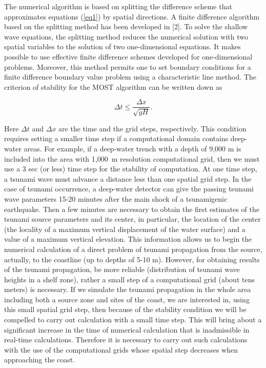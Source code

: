 \documentclass{aip-cp}
\begin{document}
The numerical algorithm is based on splitting the difference scheme that 
approximates equations (\ref{eq1}) by spatial directions. A finite difference 
algorithm based on the splitting method has been developed in [2]. To solve 
the shallow wave equations, the splitting method reduces the numerical 
solution with two spatial variables to the solution of two one-dimensional 
equations. It makes possible to use effective finite difference schemes 
developed for one-dimensional problems. Moreover, this method permits one to 
set boundary conditions for a finite difference boundary value problem using 
a characteristic line method. The criterion of stability for the MOST 
algorithm can be written down as 

\begin{equation}
\label{eq4}
\Delta t \le \frac{\Delta x} { \sqrt{gH}} .
\end{equation}

Here $\Delta t$ and $\Delta x$ are the time and the grid steps, respectively. 
This condition requires setting a smaller time step if a computational 
domain contains deep-water areas. For example, if a deep-water trench with a 
depth of 9,000 m is included into the area with 1,000~m resolution 
computational grid, then we must use a 3 sec (or less) time step for the 
stability of computation. At one time step, a tsunami wave must advance a 
distance less than one spatial grid step. In the case of tsunami occurrence, 
a deep-water detector can give the passing tsunami wave parameters 15-20 
minutes after the main shock of a tsunamigenic earthquake. Then a few 
minutes are necessary to obtain the first estimates of the tsunami source 
parameters and its center, in particular, the location of the center (the 
locality of a maximum vertical displacement of the water surface) and a 
value of a maximum vertical elevation. This information allows us to begin 
the numerical calculation of a direct problem of tsunami propagation from 
the source, actually, to the coastline (up to depths of 5-10 m). However, 
for obtaining results of the tsunami propagation, be more reliable 
(distribution of tsunami wave heights in a shelf zone), rather a small step 
of a computational grid (about tens meters) is necessary. If we simulate the 
tsunami propagation in the whole area including both a source zone and sites 
of the coast, we are interested in, using this small spatial grid step, then 
because of the stability condition we will be compelled to carry out 
calculation with a small time step. This will bring about a significant 
increase in the time of numerical calculation that is inadmissible in 
real-time calculations. Therefore it is necessary to carry out such 
calculations with the use of the computational grids whose spatial step 
decreases when approaching the coast.
\end{document}
